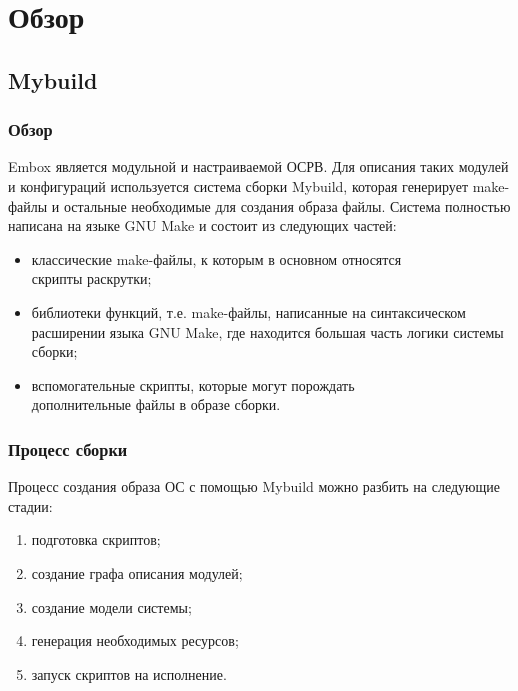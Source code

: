 
\section{Обзор}
\label{sec:relatedworks}
\subsection{Mybuild}
\subsubsection{Обзор}
Embox является модульной и настраиваемой ОСРВ. Для описания таких модулей и конфигураций используется система сборки Mybuild, которая генерирует make-файлы и остальные необходимые для создания образа файлы. Система полностью написана на языке GNU Make и состоит из следующих частей:
\begin{itemize}
	\item классические make-файлы, к которым в основном относятся \\ скрипты раскрутки;
	\item библиотеки функций, т.е. make-файлы, написанные на синтаксическом расширении языка GNU Make, где находится большая часть логики системы сборки;
	\item вспомогательные скрипты, которые могут порождать \\ дополнительные файлы в образе сборки.
\end{itemize}

\subsubsection{Процесс сборки}
Процесс создания образа ОС с помощью Mybuild можно разбить на следующие стадии:
\begin{enumerate}
	\item подготовка скриптов;
	\item создание графа описания модулей;
	\item создание модели системы;
	\item генерация необходимых ресурсов;
	\item запуск скриптов на исполнение.
\end{enumerate}

